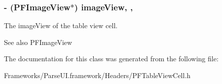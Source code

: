 \subsubsection[{image\+View}]{\setlength{\rightskip}{0pt plus 5cm}-\/ (P\+F\+Image\+View$\ast$) image\+View\hspace{0.3cm}{\ttfamily [read]}, {\ttfamily [nonatomic]}, {\ttfamily [strong]}}\label{interface_p_f_table_view_cell_a7a0539734c5a2d002fba791497adbfa2}
The image\+View of the table view cell.

\begin{DoxySeeAlso}{See also}
{\ttfamily P\+F\+Image\+View} 
\end{DoxySeeAlso}


The documentation for this class was generated from the following file\+:\begin{DoxyCompactItemize}
\item 
Frameworks/\+Parse\+U\+I.\+framework/\+Headers/P\+F\+Table\+View\+Cell.\+h\end{DoxyCompactItemize}
